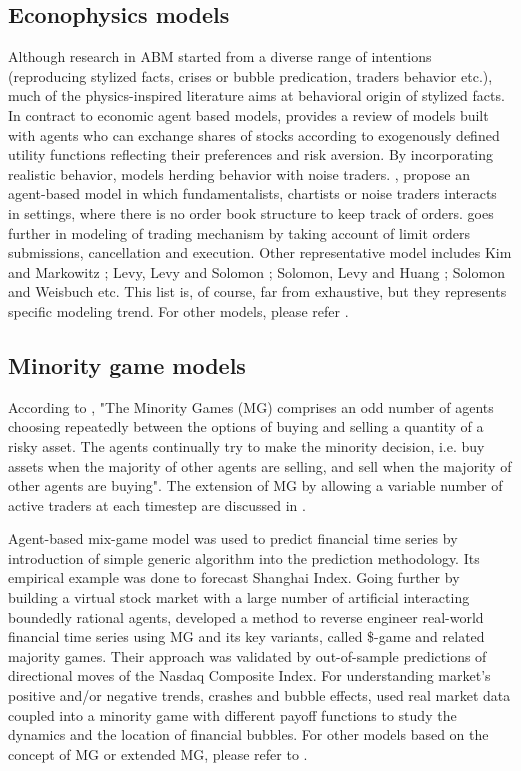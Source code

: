 \documentclass[12pt,a4paper]{article}
\numberwithin{equation}{section}
\numberwithin{figure}{section}
\numberwithin{table}{section}
\begin{document}
\subsection{Econophysics models}
Although research in ABM started from a diverse range of intentions (reproducing stylized facts, crises or bubble predication, traders behavior etc.), much of the physics-inspired literature aims at behavioral origin of stylized facts. In contract to economic agent based models, \citet{lebaron2006} provides a review of models built with agents who can exchange shares of stocks according to exogenously defined utility functions reflecting their
preferences and risk aversion. By incorporating realistic behavior, \citet{ContBouchaud2000} models herding behavior with noise traders. \citet{LuxMarchesi1999}, propose an agent-based model in which fundamentalists, chartists or noise traders interacts in settings, where there is no order book structure to keep track of orders. \citet{chiarella2002} goes further in modeling of trading mechanism by taking account of limit orders submissions, cancellation and execution. Other representative model includes Kim and Markowitz \citep{markowitz1989}; Levy, Levy and Solomon \citep{levy1994}; Solomon, Levy and Huang \citep{huang2001}; Solomon and Weisbuch \citep{solomon2002} etc. This list is, of course, far from exhaustive, but they represents specific modeling trend. For other models, please refer \citet{CristelliPietroneroZaccaria2011, chak2011, samanidou2007, lebaron2006}.
 
\subsection{Minority game models}
According to \citet{gou2005}, "The Minority Games (MG) comprises an odd number of agents choosing repeatedly between the options of buying and selling a quantity of a risky asset. The agents continually try to make the minority decision, i.e. buy assets when the majority of other agents are selling, and sell when the majority of other agents are buying". The extension of MG by allowing a variable number of active traders at each timestep are discussed in 
\citet{gou2005, challet2000, challet2001, wiesinger2013, chak2011}.

Agent-based mix-game model \citep{gou2005} was used to predict financial time series by introduction of simple generic algorithm into the prediction methodology. Its empirical example was done to forecast Shanghai Index. Going further by building a virtual stock market with a large number of artificial interacting boundedly rational agents, \citet{wiesinger2013} developed a method to reverse engineer real-world financial time series using MG and its key variants, called \$-game and related majority games. Their approach was validated by out-of-sample predictions of directional moves of the Nasdaq Composite Index. For understanding market's positive and/or negative trends, crashes and bubble eﬀects, \citet{bonnet2005} used real market data coupled into a minority game with diﬀerent payoﬀ functions to study the dynamics and the location of financial bubbles. For other models based on the concept of MG or extended MG, please refer to \citet{chak2011}.
\end{document}
